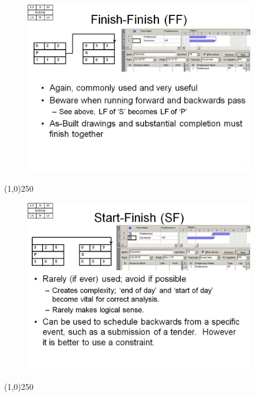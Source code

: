 \begin{frame}
\begin{figure}
	\centering
		\includegraphics[width = 10.0cm]{oldnotes/Slide178.jpg}
\end{figure}
\end{frame}
\begin{center}\line(1,0){250}\end{center}




\begin{frame}
\begin{figure}
	\centering
		\includegraphics[width = 10.0cm]{oldnotes/Slide179.jpg}
\end{figure}
\end{frame}
\begin{center}\line(1,0){250}\end{center}




